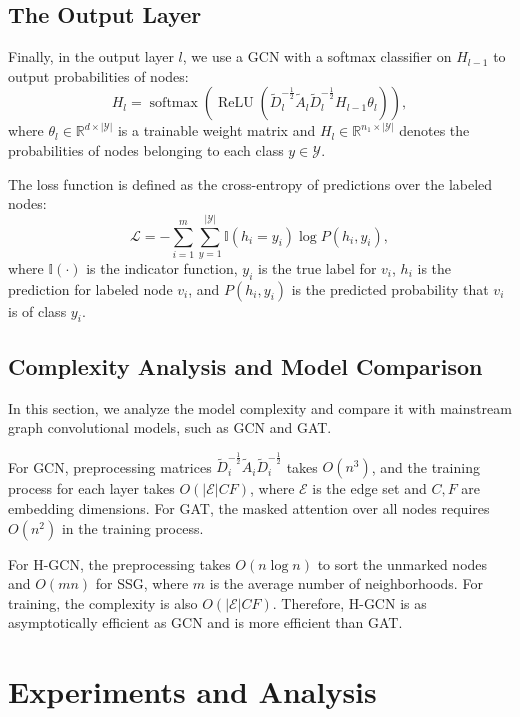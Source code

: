 \documentclass{article}
\begin{document}
\subsection{The Output Layer}

Finally, in the output layer $l$, we use a GCN with a softmax classifier on $H_{l - 1}$ to output probabilities of nodes:
\begin{equation}
	H_l = \operatorname{softmax}\left( \operatorname{ReLU} \left( \tilde{D}^{-\frac {1}{2}}_{l} \tilde{A}_{l} \tilde{D}^{-\frac{1}{2}}_{l} H_{l - 1} \theta_{l} \right) \right),
\end{equation}
where $\theta_{l} \in \mathbb{R}^{d \times |\mathcal{Y}|}$ is a trainable weight matrix and $H_l \in \mathbb{R}^{n_1 \times |\mathcal{Y}|}$ denotes the probabilities of nodes belonging to each class $y \in \mathcal{Y}$.

The loss function is defined as the cross-entropy of predictions over the labeled nodes:
\begin{equation}
	\mathcal{L} = -\sum_{i = 1}^{m}\sum_{y = 1}^{|\mathcal{Y}|} \mathbb{I}(h_i = y_i) \log{P(h_i, y_i)},
\end{equation}
where $\mathbb{I}(\cdot)$ is the indicator function, $y_i$ is the true label for $v_i$, $h_i$ is the prediction for labeled node $v_i$, and $P(h_i, y_i)$ is the predicted probability that $v_i$ is of class $y_i$.

\subsection{Complexity Analysis and Model Comparison}

In this section, we analyze the model complexity and compare it with mainstream graph convolutional models, such as GCN and GAT.

For GCN, preprocessing matrices $\tilde{D}_i^{-\frac{1}{2}} \tilde{A}_i \tilde{D}_i^{-\frac {1}{2}}$ takes $O(n^3)$, and the training process for each layer takes $O(|\mathcal{E}|CF)$, where $\mathcal{E}$ is the edge set and $C, F$ are embedding dimensions. For GAT, the masked attention over all nodes requires $O(n^2)$ in the training process.

For H-GCN, the preprocessing takes $O(n\log n)$ to sort the unmarked nodes and $O(mn)$ for SSG, where $m$ is the average number of neighborhoods. For training, the complexity is also $O(|\mathcal{E}|CF)$. Therefore, H-GCN is as asymptotically efficient as GCN and is more efficient than GAT.
 \section{Experiments and Analysis}
\end{document}
